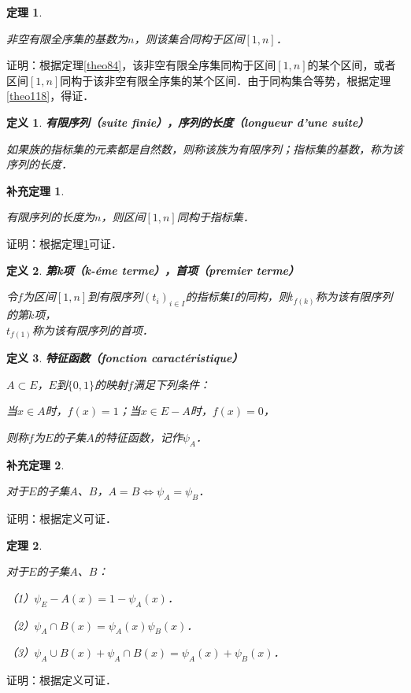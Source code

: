 \documentclass[12pt, a4paper, oneside]{book}
\newtheorem{theo}{定理}
\newtheorem{cor}{补充定理}
\newtheorem{de}{定义}
\begin{document}
			\begin{theo}\label{theo138}
				\hfill\par
				非空有限全序集的基数为$n$，则该集合同构于区间$[1, n]$．
			\end{theo}
			证明：根据定理\ref{theo84}，该非空有限全序集同构于区间$[1, n]$的某个区间，或者区间$[1, n]$同构于该非空有限全序集的某个区间．由于同构集合等势，根据定理\ref{theo118}，得证．
			
			\begin{de}
				\textbf{有限序列（suite finie），序列的长度（longueur d'une suite）}
				\par
				如果族的指标集的元素都是自然数，则称该族为有限序列；指标集的基数，称为该序列的长度．
			\end{de}
			
			\begin{cor}\label{cor313}
				\hfill\par
				有限序列的长度为$n$，则区间$[1, n]$同构于指标集．
			\end{cor}
			证明：根据定理\ref{theo138}可证．
			
			\begin{de}
				\textbf{第k项（k-éme terme），首项（premier terme）}
				\par
				令$f$为区间$[1, n]$到有限序列$(t_i)_{i\in I}$的指标集$I$的同构，则$t_{f(k)}$称为该有限序列的第$k$项，\\$t_{f(1)}$称为该有限序列的首项．
			\end{de}
			
			\begin{de}
				\textbf{特征函数（fonction caractéristique）}
				\par
				$A\subset E$，$E$到$\{0, 1\}$的映射$f$满足下列条件：
				\par
				当$x\in A$时，$f(x)=1$；当$x\in E-A$时，$f(x)=0$，
				\par
				则称$f$为$E$的子集$A$的特征函数，记作$\psi_A$．
			\end{de}
			
			\begin{cor}\label{cor314}
				\hfill\par
				对于$E$的子集$A$、$B$，$A=B\Leftrightarrow \psi_A=\psi_B$．
			\end{cor}
			证明：根据定义可证．
			
			\begin{theo}\label{theo139}
				\hfill\par
				对于$E$的子集$A$、$B$：
				\par
				（1）$\psi_E-A(x)=1-\psi_A(x)$．
				\par
				（2）$\psi_A\cap B(x)=\psi_A(x)\psi_B(x)$．
				\par
				（3）$\psi_A\cup B(x)+\psi_A\cap B(x)= \psi_A(x)+\psi_B(x)$．
			\end{theo}
			证明：根据定义可证．
			
\end{document}
